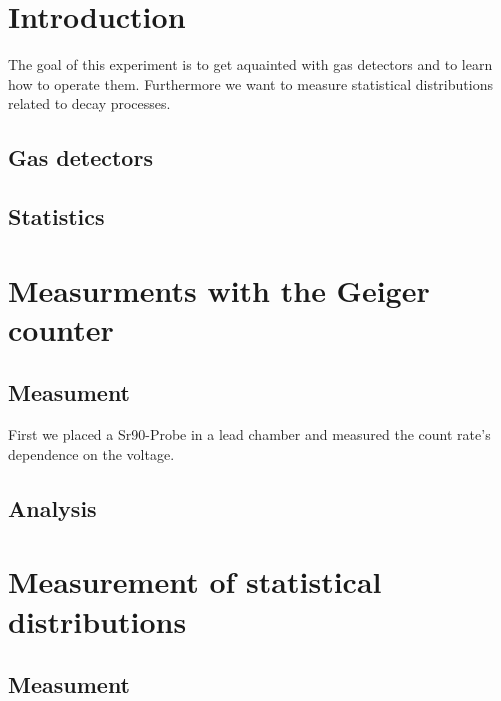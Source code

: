 \tableofcontents
\newpage
\listoffigures

\listoftables

\skippage

\setcounter{page}{1}
\restoregeometry
\thispagestyle{fancy}


\section{Introduction}

The goal of this experiment is to get aquainted with gas detectors and to learn how to operate them. Furthermore we want to measure statistical distributions related to decay processes.

\subsection{Gas detectors}

\subsection{Statistics}

\section{Measurments with the Geiger counter}

\subsection{Measument}

First we placed a Sr90-Probe in a lead chamber and measured the count rate's dependence on the voltage. 

\subsection{Analysis}

\section{Measurement of statistical distributions}

\subsection{Measument}

